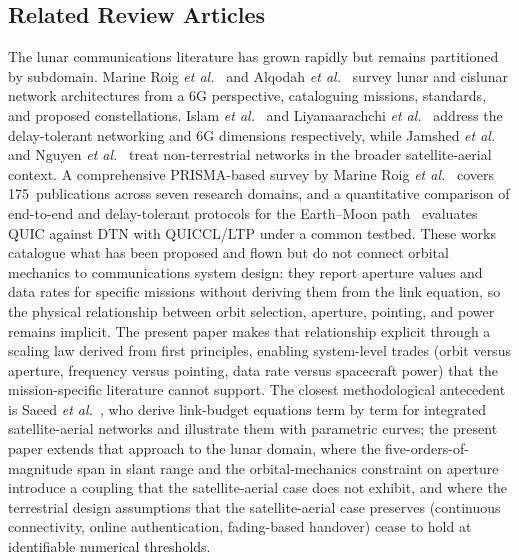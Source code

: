 \documentclass[11pt,a4paper]{article}
\begin{document}
\subsection{Related Review Articles}
The lunar communications literature has grown rapidly but remains partitioned by subdomain. Marine Roig \emph{et al.}~\cite{marine_roig_survey} and Alqodah \emph{et al.}~\cite{alqodah_review} survey lunar and cislunar network architectures from a 6G perspective, cataloguing missions, standards, and proposed constellations. Islam \emph{et al.}~\cite{islam_dtn_survey} and Liyanaarachchi \emph{et al.}~\cite{liyanaarachchi_cislunar} address the delay-tolerant networking and 6G dimensions respectively, while Jamshed \emph{et al.}~\cite{jamshed_ntn_tutorial} and Nguyen \emph{et al.}~\cite{nguyen_ntn_ojcoms2024} treat non-terrestrial networks in the broader satellite-aerial context. A comprehensive PRISMA-based survey by Marine Roig \emph{et al.}~\cite{marine_roig_survey_2026} covers 175~publications across seven research domains, and a quantitative comparison of end-to-end and delay-tolerant protocols for the Earth--Moon path~\cite{e2e_vs_dtn_2026} evaluates QUIC against DTN with QUICCL/LTP under a common testbed. These works catalogue what has been proposed and flown but do not connect orbital mechanics to communications system design: they report aperture values and data rates for specific missions without deriving them from the link equation, so the physical relationship between orbit selection, aperture, pointing, and power remains implicit. The present paper makes that relationship explicit through a scaling law derived from first principles, enabling system-level trades (orbit versus aperture, frequency versus pointing, data rate versus spacecraft power) that the mission-specific literature cannot support. The closest methodological antecedent is Saeed \emph{et al.}~\cite{saeed_ojcoms2021}, who derive link-budget equations term by term for integrated satellite-aerial networks and illustrate them with parametric curves; the present paper extends that approach to the lunar domain, where the five-orders-of-magnitude span in slant range and the orbital-mechanics constraint on aperture introduce a coupling that the satellite-aerial case does not exhibit, and where the terrestrial design assumptions that the satellite-aerial case preserves (continuous connectivity, online authentication, fading-based handover) cease to hold at identifiable numerical thresholds.
\end{document}

